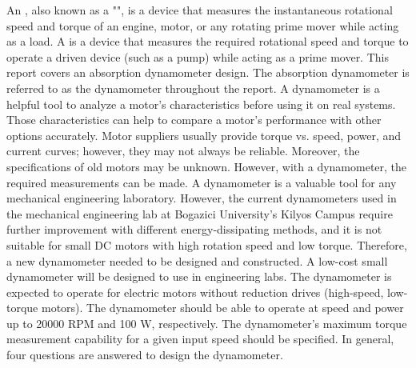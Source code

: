 \markdownRendererDocumentBegin
{}\markdownRendererInterblockSeparator
{}An , also known as a "", is a device that measures the instantaneous rotational speed and torque of an engine, motor, or any rotating prime mover while acting as a load. A  is a device that measures the required rotational speed and torque to operate a driven device (such as a pump) while acting as a prime mover.\markdownRendererInterblockSeparator
{}This report covers an absorption dynamometer design. The absorption dynamometer is referred to as the dynamometer throughout the report.\markdownRendererInterblockSeparator
{}A dynamometer is a helpful tool to analyze a motor's characteristics before using it on real systems. Those characteristics can help to compare a motor's performance with other options accurately.\markdownRendererInterblockSeparator
{}Motor suppliers usually provide torque vs. speed, power, and current curves; however, they may not always be reliable. Moreover, the specifications of old motors may be unknown. However, with a dynamometer, the required measurements can be made.\markdownRendererInterblockSeparator
{}\markdownRendererInterblockSeparator
{}A dynamometer is a valuable tool for any mechanical engineering laboratory. However, the current dynamometers used in the mechanical engineering lab at Bogazici University's Kilyos Campus require further improvement with different energy-dissipating methods, and it is not suitable for small DC motors with high rotation speed and low torque. Therefore, a new dynamometer needed to be designed and constructed.\markdownRendererInterblockSeparator
{}\markdownRendererInterblockSeparator
{}A low-cost small dynamometer will be designed to use in engineering labs. The dynamometer is expected to operate for electric motors without reduction drives (high-speed, low-torque motors).\markdownRendererInterblockSeparator
{}\markdownRendererUlBeginTight
\markdownRendererUlItem The dynamometer should be able to operate at speed and power up to 20000 RPM and 100 W, respectively.\markdownRendererUlItemEnd 
\markdownRendererUlItem The dynamometer's maximum torque measurement capability for a given input speed should be specified.\markdownRendererUlItemEnd 
\markdownRendererUlEndTight \markdownRendererInterblockSeparator
{}In general, four questions are answered to design the dynamometer.\markdownRendererInterblockSeparator
